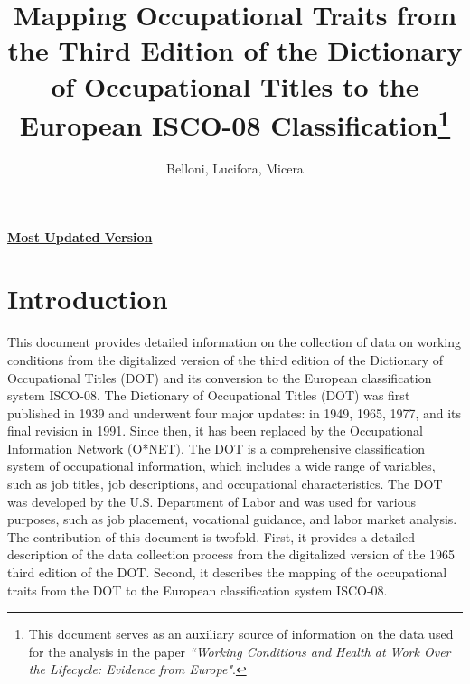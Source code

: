 \documentclass[11pt, a4paper, leqno]{article}
\title{Mapping Occupational Traits from the Third Edition of the Dictionary of Occupational Titles to the European ISCO-08 Classification\thanks{This document serves as an auxiliary source of information on the data used for the analysis in the paper \textit{``Working Conditions and Health at Work Over the Lifecycle: Evidence from Europe"}.}}
\author{Belloni, Lucifora, Micera}
\date{}
\begin{document}
\setlength{\droptitle}{-5em}   %

\maketitle
\vspace{-6.2em}

\begin{center}  \href{https://github.com/paolomicera/DOT3rd-ISCO08/blob/main/main.pdf}{\textbf{Most Updated Version}}
\end{center}
\section{Introduction}
This document provides detailed information on the collection of data on working conditions from the digitalized version of the third edition of the Dictionary of Occupational Titles (DOT) and its conversion to the European classification system ISCO-08. 
The Dictionary of Occupational Titles (DOT) was first published in 1939 and underwent four major updates: in 1949, 1965, 1977, and its final revision in 1991. Since then, it has been replaced by the Occupational Information Network (O*NET). The DOT is a comprehensive classification system of occupational information, which includes a wide range of variables, such as job titles, job descriptions, and occupational characteristics. The DOT was developed by the U.S. Department of Labor and was used for various purposes, such as job placement, vocational guidance, and labor market analysis. The contribution of this document is twofold. First, it provides a detailed description of the data collection process from the digitalized version of the 1965 third edition of the DOT. Second, it describes the mapping of the occupational traits from the DOT to the European classification system ISCO-08.
\end{document}
